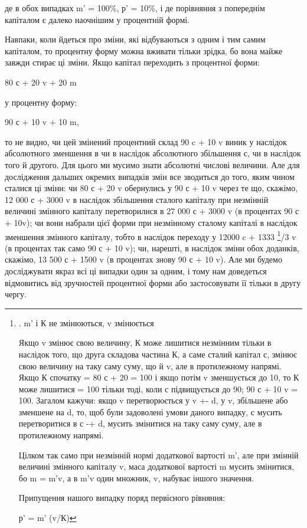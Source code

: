 де в обох випадках m' = 100\%, р' = 10\%, і де порівняння з попереднім
капіталом є далеко наочнішим у процентній формі.

Навпаки, коли йдеться про зміни, які відбуваються з одним
і тим самим капіталом, то процентну форму можна вживати
тільки зрідка, бо вона майже завжди стирає ці зміни. Якщо
капітал переходить з процентної форми:

80 с + 20 v + 20 m

у процентну форму:

90 с + 10 v + 10 m,

то не видно, чи цей змінений процентний склад 90 c + 10 v виник
у наслідок абсолютного зменшення в чи в наслідок абсолютного
збільшення с, чи в наслідок того й другого. Для цього ми мусимо
знати абсолютні числові величини. Але для дослідження
дальших окремих випадків змін все зводиться до того, яким
чином сталися ці зміни: чи 80 с + 20 v обернулись у 90 с + 10 v
через те що, скажімо, 12 000 с + 3000 v в наслідок збільшення
сталого капіталу при незмінній величині змінного капіталу перетворилися
в 27 000 с + 3000 v (в процентах 90 с + 10v); чи вони
набрали цієї форми при незмінному сталому капіталі в наслідок
зменшення змінного капіталу, тобто в наслідок переходу у
12000 c + 1333 \footnote{
. m' і К не змінюються, v змінюється

Якщо v змінює свою величину, К може лишитися незмінним
тільки в наслідок того, що друга складова частина К, а саме
сталий капітал с, змінює свою величину на таку саму суму, що й v,
але в протилежному напрямі. Якщо К спочатку = 80 с + 20 = 100
і якщо потім v зменшується до 10, то К може лишитися = 100
тільки тоді, коли с підвищується до 90; 90 с + 10 v = 100. Загалом
кажучи: якщо v перетворюється у v +- d, у v, збільшене або
зменшене на d, то, щоб були задоволені умови даного випадку,
с мусить перетворитися в с -+ d, мусить змінитися на таку саму
суму, але в протилежному напрямі.

Цілком так само при незмінній нормі додаткової вартості m',
але при змінній величині змінного капіталу v, маса додаткової
вартості m мусить змінитися, бо m = m'v, а в m'v один множник,
v, набуває іншого значення.

Припущення нашого випадку поряд первісного рівняння:

р' = m' (v/К)
}/3 v (в процентах так само 90 с + 10 v); чи, нарешті,
в наслідок зміни обох доданків, скажімо, 13 500 с + 1500 v
(в процентах знову 90 с + 10 v). Але ми будемо досліджувати
якраз всі ці випадки один за одним, і тому нам доведеться
відмовитись від зручностей процентної форми або застосовувати
її тільки в другу чергу.
